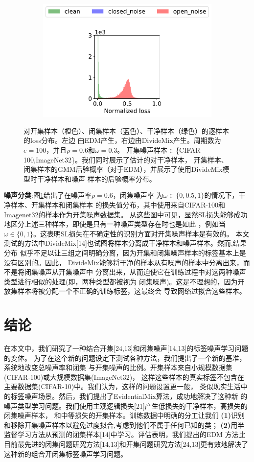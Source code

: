 \documentclass[11pt]{article}
\begin{document}
\begin{figure}[t]
\begin{subfigure}{.18\textwidth}
  \end{subfigure}
  \\
  \begin{subfigure}{\textwidth}
    \centering
    \includegraphics[width=0.4\linewidth]{images/loss_dist/legend.pdf} 
  \end{subfigure}
  \caption{对开集样本（橙色）、闭集样本（蓝色）、干净样本（绿色）的逐样本的loss分布。左边
  由EDM产生，右边由DivideMix产生。周期数为$e=100$，并且$\rho = 0.6$和$\omega  = 0.3$。
  开集噪声样本$\in$\{CIFAR-100,ImageNet32\}。我们同时展示了估计的对干净样本，
  开集样本、闭集样本的GMM后验概率（对于EDM），并展示了使用DivideMix模型时干净样本和噪声
  样本的后验概率分布。}
  \label{fig5}
\end{figure}


\textbf{噪声分类}:图\ref{fig5}给出了在噪声率$\rho=0.6$，闭集噪声率
为$\omega\in \{0,0.5,1\}$的情况下，干净样本、开集样本和闭集样本
的损失值分布，其中使用来自CIFAR-100和Imagenet32的样本作为开集噪声数据集。
从这些图中可见，显然SL损失能够成功地区分上述三种样本，即使是只有一种噪声类型存在时也是如此
，例如当$\omega \in \{0,1\}$。这表明SL损失在不确定性的识别方面对开集噪声样本是有效的。
本文测试的方法中DivideMix[14]也试图将样本分离成干净样本和噪声样本。然而,结果分布
似乎不足以让三组之间明确分离，因为开集和闭集噪声样本的标签基本上是没有区别的。因此，
DivideMix能够将干净的样本从有噪声的样本中分离出来，而不是将闭集噪声从开集噪声中
分离出来，从而迫使它在训练过程中对这两种噪声类型进行相似的处理(即，两种类型都被视为
闭集噪声)。这是不理想的，因为开放集样本将被分配一个不正确的训练标签，这最终会
导致网络过拟合这些样本。

    
\section{结论}
在本文中，我们研究了一种结合开集[24,13]和闭集噪声[14,13]的标签噪声学习问题的变体。
为了在这个新的问题设定下测试各种方法，我们提出了一个新的基准，系统地改变总噪声率和闭集
与开集噪声的比例。开集样本来自小规模数据集(CIFAR-100)或大规模数据集(ImageNet32)，
这样这些样本的真实标签不包含在主要数据集(CIFAR-10)中。我们认为，这样的问题设置更一般，
类似现实生活中的标签噪声场景。然后，我们提出了EvidentialMix算法，成功地解决了这种新
的噪声类型学习问题。我们使用主观逻辑损失[21]产生低损失的干净样本，高损失的闭集噪声样本，
和中等损失的开集样本。训练数据中明确的分工让我们
\textbf{(1)}识别和移除开集噪声样本以避免过度拟合,考虑到他们不属于任何已知的类；
\textbf{(2)}用半监督学习方法从预测的闭集样本[14]中学习。评估表明，我们提出的EDM
方法比目前最先进的闭集问题研究方法[14,13]和开集问题研究方法[24,13]更有效地解决了
这种新的组合开闭集标签噪声学习问题。
\end{document}
